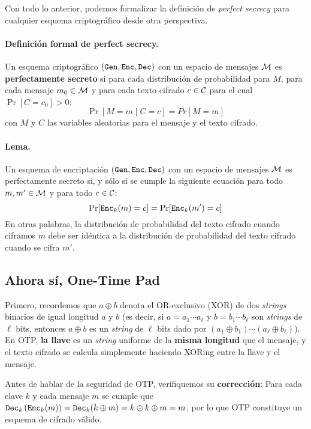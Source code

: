 Con todo lo anterior, podemos formalizar la definición de \textit{perfect secrecy} para cualquier esquema criptográfico desde otra perspectiva.

\paragraph*{Definición formal de perfect secrecy.} Un esquema criptográfico $(\texttt{Gen}, \texttt{Enc}, \texttt{Dec})$ con un espacio de mensajes $\mathcal{M}$ es \textbf{perfectamente secreto} si para cada distribución de probabilidad para $M$, para cada mensaje $m_0 \in \mathcal{M}$ y para cada texto cifrado $c \in \mathcal{C}$ para el cual $\Pr[C = c_0] > 0$:
$$
    \Pr[M = m \mid C = c] = Pr[M = m]
$$
con $M$ y $C$ las variables aleatorias para el mensaje y el texto cifrado.
\paragraph*{Lema.} Un esquema de encriptación $(\texttt{Gen}, \texttt{Enc}, \texttt{Dec})$ con un espacio de mensajes $\mathcal{M}$ es perfectamente secreto si, y sólo si se cumple la siguiente ecuación para todo $m, m' \in \mathcal{M}$ y para todo $c \in \mathcal{C}$:
$$
    \Pr[\texttt{Enc}_k(m) = c] = \Pr[\texttt{Enc}_k(m') = c]
$$
En otras palabras, la distribución de probabilidad del texto cifrado cuando ciframos $m$ debe ser idéntica a la distribución de probabilidad del texto cifrado cuando se cifra $m'$.

\subsection{Ahora sí, One-Time Pad}

Primero, recordemos que $a \oplus b$ denota el OR-exclusivo (XOR) de dos \textit{strings} binarios de igual longitud $a$ y $b$ (es decir, si $a=a_1 \cdots a_{\ell}$ y $b=b_1 \cdots b_{\ell}$ son \textit{strings} de $\ell$ bits, entonces $a \oplus b$ es un \textit{string} de $\ell$ bits dado por $\left(a_1 \oplus b_1\right) \cdots\left(a_{\ell} \oplus b_{\ell}\right)$). En OTP, \textbf{la llave} es un \textit{string} uniforme de la \textbf{misma longitud} que el mensaje, y el texto cifrado se calcula simplemente haciendo XORing entre la llave y el mensaje. \medbreak

Antes de hablar de la seguridad de OTP, verifiquemos su \textbf{corrección}: Para cada clave $k$ y cada mensaje $m$ se cumple que $\texttt{Dec}_k\left(\texttt{Enc}_k(m)\right) = \texttt{Dec}_k(k \oplus m) = k \oplus k \oplus m=m$, por lo que OTP constituye un esquema de cifrado válido.
